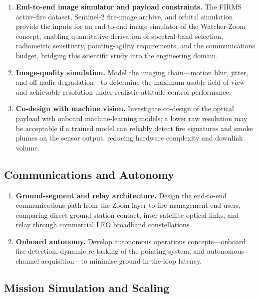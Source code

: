 \begin{enumerate}
    \item \textbf{End-to-end image simulator and payload constraints.} The FIRMS active-fire dataset, Sentinel-2 fire-image archive, and orbital simulation provide the inputs for an end-to-end image simulator of the Watcher-Zoom concept, enabling quantitative derivation of spectral-band selection, radiometric sensitivity, pointing-agility requirements, and the communications budget, bridging this scientific study into the engineering domain.
    \item \textbf{Image-quality simulation.} Model the imaging chain---motion blur, jitter, and off-nadir degradation---to determine the maximum usable field of view and achievable resolution under realistic attitude-control performance.
    \item \textbf{Co-design with machine vision.} Investigate co-design of the optical payload with onboard machine-learning models; a lower raw resolution may be acceptable if a trained model can reliably detect fire signatures and smoke plumes on the sensor output, reducing hardware complexity and downlink volume.
\end{enumerate}

\subsection{Communications and Autonomy}

\begin{enumerate}
    \item \textbf{Ground-segment and relay architecture.} Design the end-to-end communications path from the Zoom layer to fire-management end users, comparing direct ground-station contact, inter-satellite optical links, and relay through commercial LEO broadband constellations.
    \item \textbf{Onboard autonomy.} Develop autonomous operations concepts---onboard fire detection, dynamic re-tasking of the pointing system, and autonomous channel acquisition---to minimise ground-in-the-loop latency.
\end{enumerate}

\subsection{Mission Simulation and Scaling}

